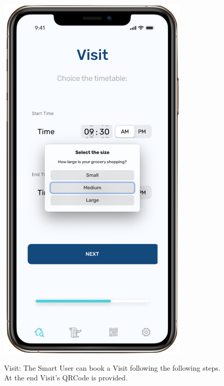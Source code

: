 \begin{figure}[H]
\begin{center}
{            \includegraphics[scale=0.35]{images/mockup/visit_size.png}
        }%
%
    \end{center}
    \caption{%
       Visit: The Smart User can book a Visit following the following steps. At the end Visit's QRCode is provided.
     }%
   \label{fig:subfigures}
\end{figure}



